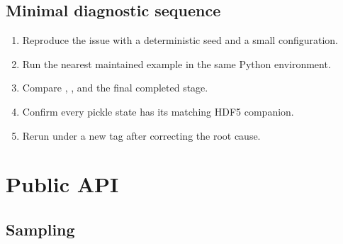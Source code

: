 \documentclass[letterpaper,10pt,english]{sphinxmanual}
\begin{document}
\section{Minimal diagnostic sequence}
\label{\detokenize{troubleshooting:minimal-diagnostic-sequence}}\begin{enumerate}
%
\item {}
\sphinxAtStartPar
Reproduce the issue with a deterministic seed and a small configuration.

\item {}
\sphinxAtStartPar
Run the nearest maintained example in the same Python environment.

\item {}
\sphinxAtStartPar
Compare , , and the final completed stage.

\item {}
\sphinxAtStartPar
Confirm every pickle state has its matching HDF5 companion.

\item {}
\sphinxAtStartPar
Rerun under a new tag after correcting the root cause.

\end{enumerate}

\sphinxstepscope


\chapter{Public API}
\label{\detokenize{api:public-api}}\label{\detokenize{api::doc}}

\section{Sampling}
\label{\detokenize{api:sampling}}
\end{document}
